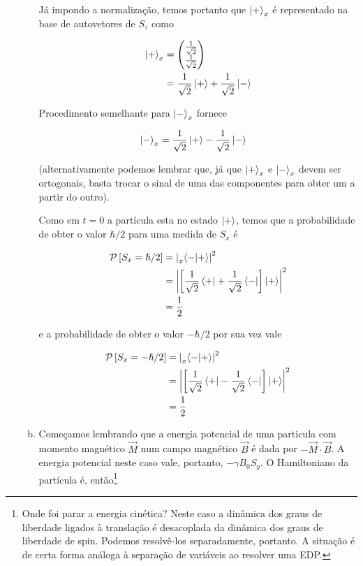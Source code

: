 \documentclass[a4paper, 12pt, notitlepage]{article}
\begin{document}
\begin{enumerate}
\begin{enumerate}[(a)]
Já impondo a normalização, temos portanto que $\ket{+}_x$ é representado na base de autovetores de $S_z$ como

\begin{align*}
 \ket{+}_x &= \begin{pmatrix} \frac{1}{\sqrt{2}} \\ \frac{1}{\sqrt{2}} \end{pmatrix} \\
  &= \frac{1}{\sqrt{2}} \ket{+} + \frac{1}{\sqrt{2}} \ket{-}
\end{align*}

Procedimento semelhante para $\ket{-}_x$ fornece

\begin{align*}
  \ket{-}_x &= \frac{1}{\sqrt{2}} \ket{+} - \frac{1}{\sqrt{2}} \ket{-}
\end{align*}

\noindent (alternativamente podemos lembrar que, já que $\ket{+}_x$ e $\ket{-}_x$ devem ser ortogonais, basta trocar o sinal de uma das componentes para obter um a partir do outro).

Como em $t = 0$ a partícula esta no estado $\ket{+}$, temos que a probabilidade de obter o valor $\hbar/2$ para uma medida de $S_x$ é

\begin{align*}
  \mathcal{P}\left[ S_x = \hslash/2\right] &= \left|\prescript{}{x}{\left\langle -|+\right\rangle}\right|^2 \\
  &= \left|\left[ \frac{1}{\sqrt{2}} \bra{+} + \frac{1}{\sqrt{2}} \bra{-} \right] \ket{+}\right|^2 \\
  &= \frac{1}{2}
\end{align*}

\noindent e a probabilidade de obter o valor $-\hbar/2$ por sua vez vale

\begin{align*}
  \mathcal{P}\left[ S_x = -\hslash/2\right] &= \left|\prescript{}{x}{\left\langle -|+\right\rangle}\right|^2 \\
  &= \left| \left[\frac{1}{\sqrt{2}}\bra{+} - \frac{1}{\sqrt{2}}\bra{-} \right]\ket{+}\right|^2 \\
  &= \frac{1}{2}
\end{align*}

\item Começamos lembrando que a energia potencial de uma particula com momento magnético $\vec{M}$ num campo magnético $\vec{B}$ é dada por $-\vec{M}\cdot\vec{B}$. A energia potencial neste caso vale, portanto, $-\gamma B_0 S_y$. O Hamiltoniano da partícula é, então\footnote{Onde foi parar a energia cinética? Neste caso a dinâmica dos graus de liberdade ligados à translação é desacoplada da dinâmica dos graus de liberdade de spin. Podemos resolvê-los separadamente, portanto. A situação é de certa forma análoga à separação de variáveis ao resolver uma EDP.}


\end{enumerate}
\end{enumerate}
\end{document}
